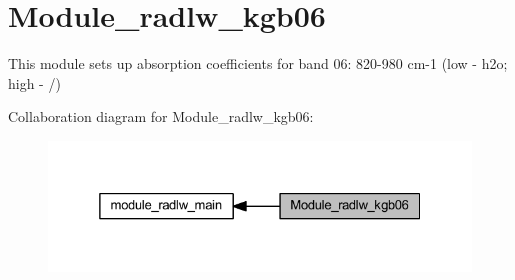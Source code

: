 \hypertarget{group__module__radlw__kgb06}{}\section{Module\+\_\+radlw\+\_\+kgb06}
\label{group__module__radlw__kgb06}


This module sets up absorption coefficients for band 06\+: 820-\/980 cm-\/1 (low -\/ h2o; high -\/ /)  


Collaboration diagram for Module\+\_\+radlw\+\_\+kgb06\+:\nopagebreak
\begin{figure}[H]
\begin{center}
\leavevmode
\includegraphics[width=325pt]{group__module__radlw__kgb06}
\end{center}
\end{figure}
